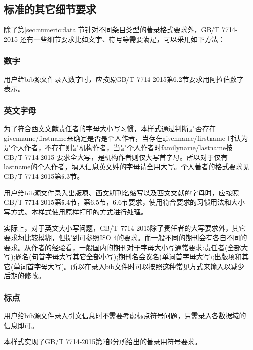 \subsection{标准的其它细节要求}

除了第\ref{sec:numeric:data}节针对不同条目类型的著录格式要求外，GB/T 7714-2015 还有一些细节要求比如文字、符号等需要满足，可以采用如下方法：

\subsubsection{数字}\label{sec:fmt:number}

\begin{property}{}{}
用户给bib源文件录入数字时，应按照GB/T 7714-2015第6.2节要求用阿拉伯数字表示。
\end{property}

\subsubsection{英文字母}\label{sec:fmt:lettercase}

\begin{property}{}{}
为了符合西文文献责任者的字母大小写习惯，本样式通过判断是否存在givenname/firstname来确定是否是个人作者，当存在givenname/firstname 时认为是个人作者，不存在则是机构作者，当是个人作者时familyname/lastname按GB/T 7714-2015 要求全大写，是机构作者则仅大写首字母。所以对于仅有lastname的个人作者，填入信息英文姓的字母请全用大写。个人著者的格式要求见GB/T 7714-2015第6.3节。

用户给bib源文件录入出版项、西文期刊名缩写以及西文文献的字母时，应按照GB/T 7714-2015第6.4节，第6.5节，6.6节要求，使用符合要求的习惯用法和大小写方式。本样式使用原样打印的方式进行处理。

实际上，对于英文大小写问题，GB/T 7714-2015除了责任者的大写要求外，其它要求均比较模糊，但提到可参照ISO 4的要求。而一般不同的期刊会有各自不同的要求。从作者的经验看，一般国内的期刊对于字母大小写通常要求:责任者(全部大写);题名(句首字母大写其它全部小写);期刊名会议名(单词首字母大写);出版项和其它(单词首字母大写)。所以在录入bib文件时可以按照这种常见方式来输入以减少后期的修改。
\end{property}

\subsubsection{标点}

\begin{property}{}{}
用户给bib源文件录入引文信息时不需要考虑标点符号问题，只需录入各数据域的信息即可。

本样式实现了GB/T 7714-2015第7部分所给出的著录用符号要求。
\end{property}

